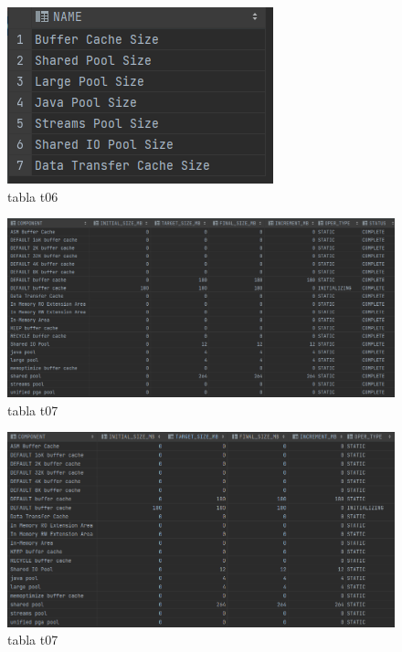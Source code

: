 \documentclass[journal]{IEEEtran}
\begin{document}
\begin{figure}[H]
  \centering
  \includegraphics[scale=.40]{captura_t06.png}
   \caption{tabla t06}
   \label{fig:validador_t06}
\end{figure}
\begin{figure}[H]
  \centering
  \includegraphics[scale=.20]{captura_5.png}
   \caption{tabla t07}
   \label{fig:validador_t07}
\end{figure}
\begin{figure}[H]
  \centering
  \includegraphics[scale=.20]{captura_6.png}
   \caption{tabla t07}
   \label{fig:validador_t09}
\end{figure}
\end{document}
